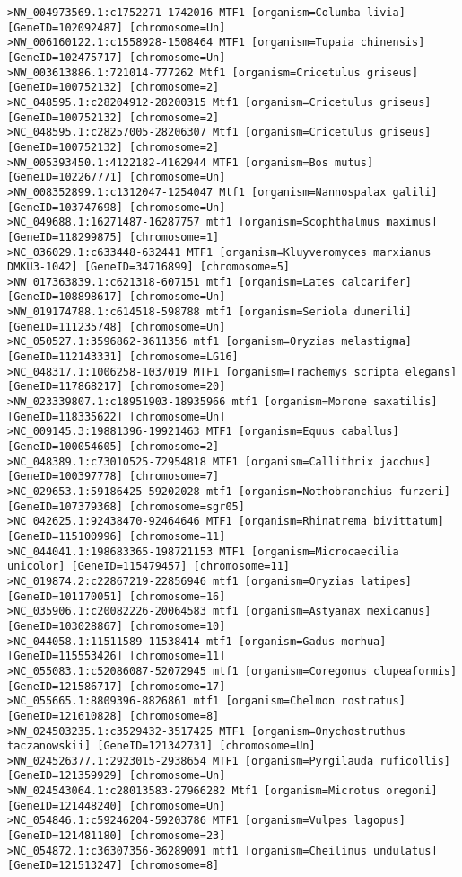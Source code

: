 \begin{lstlisting}[basicstyle=\tiny\ttfamily]
>NW_004973569.1:c1752271-1742016 MTF1 [organism=Columba livia] [GeneID=102092487] [chromosome=Un]
>NW_006160122.1:c1558928-1508464 MTF1 [organism=Tupaia chinensis] [GeneID=102475717] [chromosome=Un]
>NW_003613886.1:721014-777262 Mtf1 [organism=Cricetulus griseus] [GeneID=100752132] [chromosome=2]
>NC_048595.1:c28204912-28200315 Mtf1 [organism=Cricetulus griseus] [GeneID=100752132] [chromosome=2]
>NC_048595.1:c28257005-28206307 Mtf1 [organism=Cricetulus griseus] [GeneID=100752132] [chromosome=2]
>NW_005393450.1:4122182-4162944 MTF1 [organism=Bos mutus] [GeneID=102267771] [chromosome=Un]
>NW_008352899.1:c1312047-1254047 Mtf1 [organism=Nannospalax galili] [GeneID=103747698] [chromosome=Un]
>NC_049688.1:16271487-16287757 mtf1 [organism=Scophthalmus maximus] [GeneID=118299875] [chromosome=1]
>NC_036029.1:c633448-632441 MTF1 [organism=Kluyveromyces marxianus DMKU3-1042] [GeneID=34716899] [chromosome=5]
>NW_017363839.1:c621318-607151 mtf1 [organism=Lates calcarifer] [GeneID=108898617] [chromosome=Un]
>NW_019174788.1:c614518-598788 mtf1 [organism=Seriola dumerili] [GeneID=111235748] [chromosome=Un]
>NC_050527.1:3596862-3611356 mtf1 [organism=Oryzias melastigma] [GeneID=112143331] [chromosome=LG16]
>NC_048317.1:1006258-1037019 MTF1 [organism=Trachemys scripta elegans] [GeneID=117868217] [chromosome=20]
>NW_023339807.1:c18951903-18935966 mtf1 [organism=Morone saxatilis] [GeneID=118335622] [chromosome=Un]
>NC_009145.3:19881396-19921463 MTF1 [organism=Equus caballus] [GeneID=100054605] [chromosome=2]
>NC_048389.1:c73010525-72954818 MTF1 [organism=Callithrix jacchus] [GeneID=100397778] [chromosome=7]
>NC_029653.1:59186425-59202028 mtf1 [organism=Nothobranchius furzeri] [GeneID=107379368] [chromosome=sgr05]
>NC_042625.1:92438470-92464646 MTF1 [organism=Rhinatrema bivittatum] [GeneID=115100996] [chromosome=11]
>NC_044041.1:198683365-198721153 MTF1 [organism=Microcaecilia unicolor] [GeneID=115479457] [chromosome=11]
>NC_019874.2:c22867219-22856946 mtf1 [organism=Oryzias latipes] [GeneID=101170051] [chromosome=16]
>NC_035906.1:c20082226-20064583 mtf1 [organism=Astyanax mexicanus] [GeneID=103028867] [chromosome=10]
>NC_044058.1:11511589-11538414 mtf1 [organism=Gadus morhua] [GeneID=115553426] [chromosome=11]
>NC_055083.1:c52086087-52072945 mtf1 [organism=Coregonus clupeaformis] [GeneID=121586717] [chromosome=17]
>NC_055665.1:8809396-8826861 mtf1 [organism=Chelmon rostratus] [GeneID=121610828] [chromosome=8]
>NW_024503235.1:c3529432-3517425 MTF1 [organism=Onychostruthus taczanowskii] [GeneID=121342731] [chromosome=Un]
>NW_024526377.1:2923015-2938654 MTF1 [organism=Pyrgilauda ruficollis] [GeneID=121359929] [chromosome=Un]
>NW_024543064.1:c28013583-27966282 Mtf1 [organism=Microtus oregoni] [GeneID=121448240] [chromosome=Un]
>NC_054846.1:c59246204-59203786 MTF1 [organism=Vulpes lagopus] [GeneID=121481180] [chromosome=23]
>NC_054872.1:c36307356-36289091 mtf1 [organism=Cheilinus undulatus] [GeneID=121513247] [chromosome=8]
\end{lstlisting}

